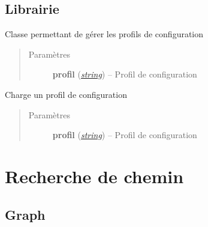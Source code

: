 \documentclass[letterpaper,10pt,french]{sphinxmanual}
\begin{document}
\section{Librairie}
\label{profils:librairie}\label{profils:module-lib.conf}

\begin{fulllineitems}
\label{profils:lib.conf.Conf}
Classe permettant de gérer les profils de configuration
\begin{quote}\begin{description}
\item[{Paramètres}] \leavevmode
\textbf{profil} (\href{http://docs.python.org/library/string.html\#module-string}{\emph{string}}) -- Profil de configuration

\end{description}\end{quote}

\begin{fulllineitems}
\label{profils:lib.conf.Conf.importer_profil}
Charge un profil de configuration
\begin{quote}\begin{description}
\item[{Paramètres}] \leavevmode
\textbf{profil} (\href{http://docs.python.org/library/string.html\#module-string}{\emph{string}}) -- Profil de configuration

\end{description}\end{quote}

\end{fulllineitems}


\end{fulllineitems}



\chapter{Recherche de chemin}
\label{recherche_chemin::doc}\label{recherche_chemin:recherche-de-chemin}

\section{Graph}
\label{recherche_chemin:graph}\label{recherche_chemin:module-lib.recherche_chemin.graph}
\end{document}
